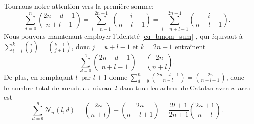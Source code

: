 Tournons notre attention vers la première somme:
\begin{equation*}
\sum_{d=0}^{n}\binom{2n-d-1}{n+l-1}
  = \sum_{i=n-1}^{2n-1}\binom{i}{n+l-1}
  = \sum_{i=n+l-1}^{2n-1}\binom{i}{n+l-1}.
\end{equation*}
Nous pouvons maintenant employer l'identité \eqref{eq_binom_sum}
, qui équivaut à \(\sum_{i=j}^{k}\binom{i}{j} =
\binom{k+1}{j+1}\), donc \(j=n+l-1\) et \(k=2n-1\) entraînent
\begin{equation*}
\sum_{d=0}^{n}\binom{2n-d-1}{n+l-1} = \binom{2n}{n+l}.
\end{equation*}
De plus, en remplaçant \(l\)~par \(l+1\) donne
\(\sum_{d=0}^{n}\binom{2n-d-1}{n+l} = \binom{2n}{n+l+1}\), donc le
nombre total de n{\oe}uds au niveau~\(l\) dans tous les arbres de
Catalan avec \(n\)~arcs est
\begin{equation}
\sum_{d=0}^{n}\mathcal{N}_n(l,d)
 = \binom{2n}{n+l} - \binom{2n}{n+l+1}
 = \frac{2l+1}{2n+1}\binom{2n+1}{n-l}.
\label{eq_N_n_l_d}
\end{equation}

